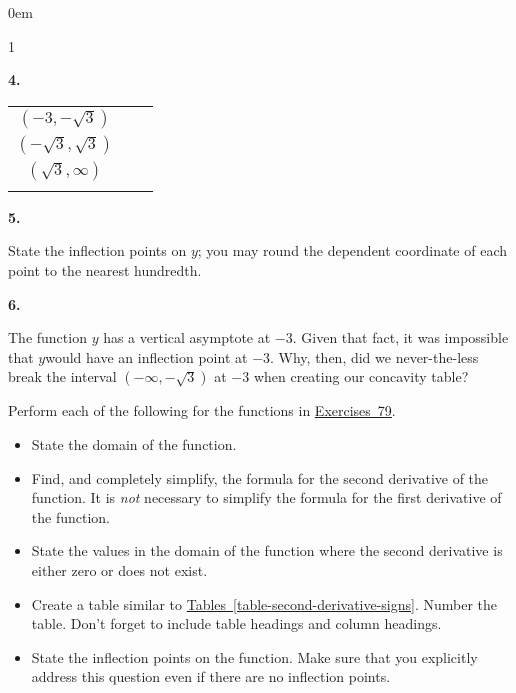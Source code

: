 \documentclass[12pt,]{book}
\theoremstyle{plain}
\theoremstyle{definition}
\numberwithin{equation}{section}
\newcommand{\hrulethin}  {\noalign{\hrule height 0.04em}}
\newcommand{\hrulethick} {\noalign{\hrule height 0.11em}}
\newenvironment{exercisegroup}%
{\medskip\noindent}%
{\par\bigskip}%
\newlength{\exercisegroupindent}%
\newlength{\exercisegroupitemwidth}%
\newenvironment{exercisegrouplist}%
{\vspace{-\partopsep}%
\begin{adjustwidth}{\exercisegroupindent}{0em}}%
{\end{adjustwidth}%
\vspace{-\partopsep}%
\vspace{\baselineskip}}%
\newenvironment{exercisegroupbycol}[1]%
{\begin{exercisegrouplist}%
\vspace{-\multicolsep}%
\begin{multicols}{#1}%
\setlength{\parindent}{0em}%
\setlength{\exercisegroupitemwidth}{\linewidth}}%
{\end{multicols}%
\vspace{-\multicolsep}%
\end{exercisegrouplist}}%
\newenvironment{exercisegroupitem}[1]%
{\begin{minipage}[t]{\exercisegroupitemwidth}
\vspace{0pt}%
{\bfseries#1}%
\rule{0pt}{\baselineskip}}{\strut%
\end{minipage}%
\hspace{\columnsep}}%
\providecommand\phantomsection{}
\newcommand{\ointerval}[2]{\left(#1,#2\right)}
\begin{document}
\begin{exerciselist}
\begin{exercisegroup}
\begin{exercisegroupbycol}{1}
\begin{exercisegroupitem}{4. }
\begin{table}
\begin{tabular}{ccc}
\(\ointerval{-3}{-\sqrt{3}}\)&&\\\hrulethin
\(\ointerval{-\sqrt{3}}{\sqrt{3}}\)&&\\\hrulethin
\(\ointerval{\sqrt{3}}{\infty}\)&&\\\hrulethick
\end{tabular}
\end{table}
\end{exercisegroupitem}%
\par%
\begin{exercisegroupitem}{5. }\phantomsection\hypertarget{exercise-432}{\null}
State the inflection points on \(y\); you may round the dependent coordinate of each point to the nearest hundredth.%
\end{exercisegroupitem}%
\par%
\begin{exercisegroupitem}{6. }\phantomsection\hypertarget{exercise-433}{\null}
The function \(y\) has a vertical asymptote at \(-3\).  Given that fact, it was impossible that \(y\)would have an inflection point at \(-3\).  Why, then, did we never-the-less break the interval \(\ointerval{-\infty}{-\sqrt{3}}\) at \(-3\) when creating our concavity table?%
\end{exercisegroupitem}%
\par%
\end{exercisegroupbycol}%
\end{exercisegroup}%
\begin{exercisegroup}%
Perform each of the following for the functions in \hyperref[exercise-make-second-derivative-table-first]{Exercises~7}\textendash{}\hyperref[exercise-make-second-derivative-table-last]{9}.%
\begin{itemize}[label=\textbullet]
\item{}State the domain of the function.\item{}Find, and completely simplify, the formula for the second derivative of the function. It is \emph{not} necessary to simplify the formula for the first derivative of the function.\item{}State the values in the domain of the function where the second derivative is either zero or does not exist.\item{}Create a table similar to \hyperref[table-second-derivative-signs]{Tables~\ref*{table-second-derivative-signs}}.  Number the table.  Don't forget to include table headings and column headings.\item{}State the inflection points on the function.  Make sure that you explicitly address this question even if there are no inflection points.\end{itemize}

\end{exercisegroup}
\end{exerciselist}
\end{document}
